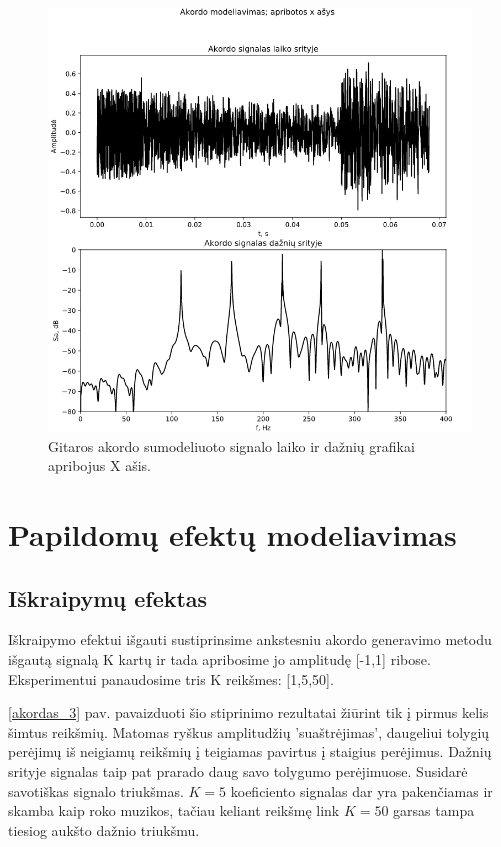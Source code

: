 \documentclass[10pt,a4paper,twocolumn]{article}
\begin{document}
\begin{figure} %
	[!h]
	\centering
	\includegraphics*[width=.9\columnwidth]{akordas_2.png} %
	\caption{Gitaros akordo sumodeliuoto signalo laiko ir dažnių grafikai apribojus X ašis.}
	\label{akordas_2}
	\vspace{6pt}
\end{figure}

\section*{Papildomų efektų modeliavimas}
\subsection*{Iškraipymų efektas}

Iškraipymo efektui išgauti sustiprinsime ankstesniu akordo generavimo metodu išgautą signalą K kartų ir tada apribosime jo amplitudę [-1,1] ribose. Eksperimentui panaudosime tris K reikšmes: [1,5,50].

\ref{akordas_3} pav. pavaizduoti šio stiprinimo rezultatai žiūrint tik į pirmus  kelis šimtus reikšmių. Matomas ryškus amplitudžių 'suaštrėjimas', daugeliui tolygių perėjimų iš neigiamų reikšmių į teigiamas pavirtus į staigius perėjimus. Dažnių srityje signalas taip pat prarado daug savo tolygumo perėjimuose. Susidarė savotiškas signalo triukšmas. $K=5$ koeficiento signalas dar yra pakenčiamas ir skamba kaip roko muzikos, tačiau keliant reikšmę link $K=50$ garsas tampa tiesiog aukšto dažnio triukšmu.
\end{document}
